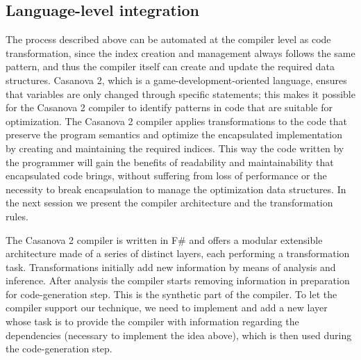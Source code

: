 \subsection{Language-level integration}

The process described above can be automated at the compiler level as code transformation, since the index creation and management always follows the same pattern, and thus the compiler itself can create and update the required data structures. Casanova 2, which is a game-development-oriented language, ensures that variables are only changed through specific statements; this makes it possible for the Casanova 2 compiler to identify patterns in code that are suitable for optimization. The Casanova 2 compiler applies transformations to the code that preserve the program semantics and optimize the encapsulated implementation by creating and maintaining the required indices. This way the code written by the programmer will gain the benefits of readability and maintainability that encapsulated code brings, without suffering from loss of performance or the necessity to break encapsulation to manage the optimization data structures. In the next session we present the compiler architecture and the transformation rules. 

The Casanova 2 compiler is written in F\# and offers a modular extensible architecture made of a series of distinct layers, each performing a transformation task. Transformations initially add new information by means of analysis and inference. After analysis the compiler starts removing information in preparation for code-generation step. This is the synthetic part of the compiler. To let the compiler support our technique, we need to implement and add a new layer whose task is to provide the compiler with information regarding the dependencies (necessary to implement the idea above), which is then used during the code-generation step.